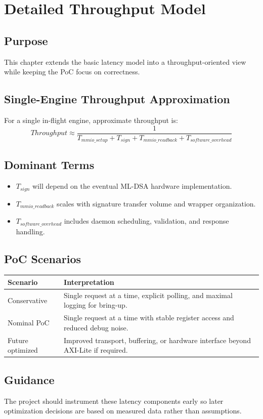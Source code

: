 \chapter{Detailed Throughput Model}

\section*{Purpose}
This chapter extends the basic latency model into a throughput-oriented view while keeping the PoC focus on correctness.

\section{Single-Engine Throughput Approximation}
For a single in-flight engine, approximate throughput is:
\[
Throughput \approx \frac{1}{T_{mmio\_setup} + T_{sign} + T_{mmio\_readback} + T_{software\_overhead}}
\]

\section{Dominant Terms}
\begin{itemize}[leftmargin=*]
  \item $T_{sign}$ will depend on the eventual ML-DSA hardware implementation.
  \item $T_{mmio\_readback}$ scales with signature transfer volume and wrapper organization.
  \item $T_{software\_overhead}$ includes daemon scheduling, validation, and response handling.
\end{itemize}

\section{PoC Scenarios}
\begin{longtable}{p{} p{}}
\toprule
Scenario & Interpretation \\
\midrule
Conservative & Single request at a time, explicit polling, and maximal logging for bring-up. \\
Nominal PoC & Single request at a time with stable register access and reduced debug noise. \\
Future optimized & Improved transport, buffering, or hardware interface beyond AXI-Lite if required. \\
\bottomrule
\end{longtable}

\section{Guidance}
The project should instrument these latency components early so later optimization decisions are based on measured data rather than assumptions.
